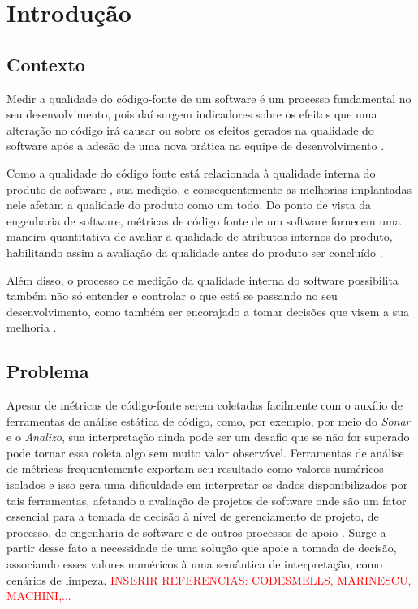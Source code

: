 \chapter{Introdução}

\section{Contexto}

Medir a qualidade do código-fonte  de um software é um processo fundamental no seu desenvolvimento, pois daí surgem indicadores sobre os efeitos que uma alteração no código irá causar ou sobre os efeitos gerados na qualidade do software após a adesão de uma nova prática na equipe de desenvolvimento \cite{Fenton98}. 

Como a qualidade do código fonte está relacionada à qualidade interna do produto de software \cite{ISO25023}, sua medição, e consequentemente as melhorias implantadas nele afetam a qualidade do produto como um todo. Do ponto de vista da engenharia de software, métricas de código fonte de um software fornecem uma maneira quantitativa de avaliar a qualidade de atributos internos do produto, habilitando assim a avaliação da qualidade antes do produto ser concluído \cite{pressman_engenharia_2010}.

Além disso, o processo de medição da qualidade interna do software possibilita também não só entender e controlar o que está se passando no seu desenvolvimento, como também ser encorajado a tomar decisões que visem a sua melhoria \cite{Fenton98}.
 
\section{Problema}
\label{intro_problema}

Apesar de métricas de código-fonte serem coletadas facilmente com o auxílio de ferramentas de análise estática de código, como, por exemplo, por meio do \textit{Sonar} e o \textit{Analizo}, sua interpretação ainda pode ser um desafio que se não for superado pode tornar essa coleta algo sem muito valor observável. Ferramentas de análise de métricas frequentemente exportam seu resultado como valores numéricos isolados \cite{Meirelles2013} e isso gera uma dificuldade em interpretar os dados disponibilizados por tais ferramentas, afetando a avaliação de projetos de software onde são um fator essencial para a tomada de decisão à nível de gerenciamento de projeto, de processo, de engenharia de software e de outros processos de apoio \cite{pandian_software_2004}. Surge a partir desse fato a necessidade de uma solução que apoie a tomada de decisão, associando esses valores numéricos à uma semântica de interpretação, como cenários de limpeza. \textcolor{red}{INSERIR REFERENCIAS: CODESMELLS, MARINESCU, MACHINI,...}

